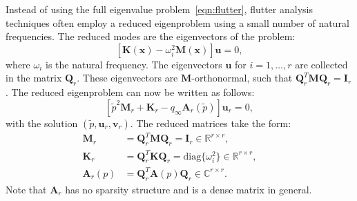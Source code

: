 \documentclass[12pt]{article}
\newcommand{\mb}{\mathbf}
\begin{document}
Instead of using the full eigenvalue problem~\eqref{eqn:flutter},
flutter analysis techniques often employ a reduced eigenproblem using
a small number of natural frequencies. The reduced modes are the
eigenvectors of the problem:
%
\begin{equation*}
  \left[ \mb{K}(\mb{x}) - \omega_{i}^2 \mb{M}(\mb{x}) \right] \mb{u} = 0,
\end{equation*}
where $\omega_{i}$ is the natural frequency. The eigenvectors
$\mb{u}$ for $i = 1, \ldots, r$ are collected in the matrix
$\mb{Q}_{r}$. These eigenvectors are $\mb{M}$-orthonormal, such that
$\mb{Q}_{r}^{T} \mb{M} \mb{Q}_{r} = \mb{I}_{r}$. The reduced
eigenproblem can now be written as follows:
%
\begin{equation*}
  \label{eqn:flutter-reduced}
  \left[ \tilde{p}^2 \mb{M}_{r} + \mb{K}_{r} - q_{\infty} \mb{A}_{r}(\tilde{p}) \right] \mb{u}_{r} = 0,
\end{equation*}
with the solution $(\tilde{p}, \mb{u}_{r}, \mb{v}_{r})$. The reduced
matrices take the form:
%
\begin{equation*}
  \begin{aligned}
    \mb{M}_{r} & = \mb{Q}_{r}^{T} \mb{M} \mb{Q}_{r} = \mb{I}_{r} \in \mathbb{R}^{r \times r}, \\ 
    \mb{K}_{r} & = \mb{Q}_{r}^{T} \mb{K} \mb{Q}_{r} = \text{diag}\{\omega_{i}^2\} \in \mathbb{R}^{r \times r}, \qquad \\ 
    \mb{A}_{r}(p) & = \mb{Q}_{r}^{T} \mb{A}(p) \mb{Q}_{r} \in \mathbb{C}^{r \times r}.
  \end{aligned}
\end{equation*}
Note that $\mb{A}_{r}$ has no sparsity structure and is a dense matrix
in general.
\end{document}
